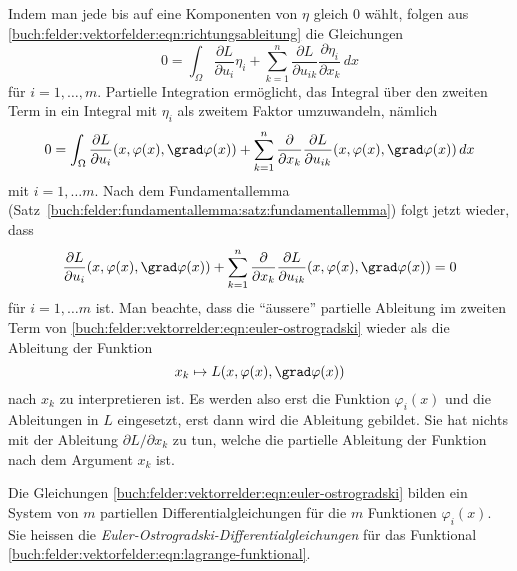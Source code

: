 Indem man jede bis auf eine Komponenten von $\eta$ gleich $0$
wählt, folgen aus
\eqref{buch:felder:vektorfelder:eqn:richtungsableitung}
die Gleichungen
\begin{equation*}
0
=
\int_{\Omega}
\frac{\partial L}{\partial u_i}
\eta_i
+
\sum_{k=1}^n
\frac{\partial L}{\partial u_{ik}}
\frac{\partial \eta_i}{\partial x_k}
\,dx
\end{equation*}
für $i=1,\dots,m$.
Partielle Integration ermöglicht, das Integral über den zweiten
Term in ein Integral mit $\eta_i$ als zweitem Faktor umzuwandeln,
nämlich
\begin{equation*}
0
=
\int_{\Omega}
\frac{\partial L}{\partial u_i}
(x,\varphi(x),\grad\varphi(x))
+
\sum_{k=1}^n
\frac{\partial}{\partial x_k}
\frac{\partial L}{\partial u_{ik}}
(x,\varphi(x),\grad\varphi(x))
\,dx
\end{equation*}
mit $i=1,\dots m$.
Nach dem Fundamentallemma
(Satz~\ref{buch:felder:fundamentallemma:satz:fundamentallemma})
folgt jetzt wieder, dass
\begin{equation}
\frac{\partial L}{\partial u_i}
(x,\varphi(x),\grad\varphi(x))
+
\sum_{k=1}^n
\frac{\partial}{\partial x_k}
\frac{\partial L}{\partial u_{ik}}
(x,\varphi(x),\grad\varphi(x))
=
0
\label{buch:felder:vektorrelder:eqn:euler-ostrogradski}
\end{equation}
für $i=1,\dots m$ ist.
Man beachte, dass die ``äussere'' partielle Ableitung im zweiten Term
von
\eqref{buch:felder:vektorrelder:eqn:euler-ostrogradski}
wieder als die Ableitung der Funktion
\[
x_k
\mapsto
L(x,\varphi(x),\grad\varphi(x))
\]
nach $x_k$ zu interpretieren ist.
Es werden also erst die Funktion $\varphi_i(x)$ und die Ableitungen
in $L$ eingesetzt, erst dann wird die Ableitung gebildet.
Sie hat nichts mit der Ableitung $\partial L/\partial x_k$ zu tun, welche
die partielle Ableitung der Funktion nach dem Argument $x_k$ ist.


Die Gleichungen
\eqref{buch:felder:vektorrelder:eqn:euler-ostrogradski}
bilden ein System von $m$ partiellen Differentialgleichungen
für die $m$ Funktionen $\varphi_i(x)$.
Sie heissen die {\em Euler-Ostrogradski-Differentialgleichungen}
für das Funktional
\eqref{buch:felder:vektorfelder:eqn:lagrange-funktional}.



